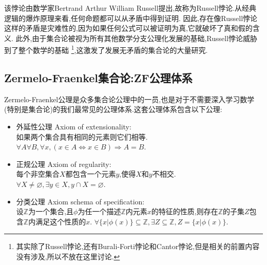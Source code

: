 \documentclass[12pt, a4paper, oneside]{ctexbook}
\begin{document}
  该悖论由数学家Bertrand Arthur William Russell提出,故称为Russell悖论.从经典逻辑的爆炸原理来看,任何命题都可以从矛盾中得到证明.
  因此,存在像Russell悖论这样的矛盾是灾难性的,因为如果任何公式可以被证明为真,它就破坏了真和假的含义.
  此外,由于集合论被视为所有其他数学分支公理化发展的基础,Russell悖论威胁到了整个数学的基础
  \footnote{
    其实除了Russell悖论,还有Burali-Forti悖论和Cantor悖论,但是相关的前置内容没有涉及,所以不放在这里讨论.
  },这激发了发展无矛盾的集合论的大量研究.
  \subsection{Zermelo-Fraenkel集合论:ZF公理体系}
  Zermelo-Fraenkel公理是众多集合论公理中的一员,也是对于不需要深入学习数学(特别是集合论)的我们最常见的公理体系.这套公理体系包含以下公理:
  \begin{itemize}
    \item 外延性公理 Axiom of extensionality:\\
      如果两个集合具有相同的元素则它们相等.
      $\forall A\forall B,\forall x,(x\in A\Leftrightarrow x\in B)\Rightarrow A=B $.
    \item 正规公理 Axiom of regularity:\\
      每个非空集合$X$都包含一个元素$y$,使得$X$和$y$不相交.
      $\forall X\neq \varnothing ,\exists y\in X,y\cap X=\varnothing $.
    \item 分类公理 Axiom schema of specification:\\
      设$\mathbb{Z}$为一个集合,且$\phi$为任一个描述$\mathbb{Z}$内元素$x$的特征的性质,则存在$\mathbb{Z}$的子集$Z$包含$\mathbb{Z}$内满足这个性质的$x$.
      $\forall \{x| \phi(x) \}\subseteq \mathbb{Z},\exists Z\subseteq \mathbb{Z},Z=\{x| \phi(x)\}$.\\
      

\end{itemize}
\end{document}
